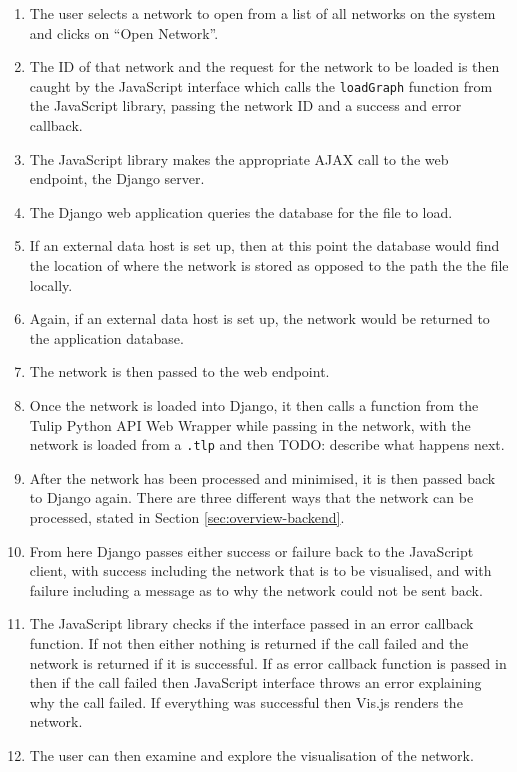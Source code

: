 \documentclass[../dissertation.tex]{subfiles}
\begin{document}
\begin{enumerate}
    \item The user selects a network to open from a list of all networks on the system and clicks on ``Open Network''.
    \item The ID of that network and the request for the network to be loaded is then caught by the JavaScript interface which calls the \texttt{loadGraph} function from the JavaScript library, passing the network ID and a success and error callback.
    \item The JavaScript library makes the appropriate AJAX call to the web endpoint, the Django server.
    \item The Django web application queries the database for the file to load.
    \item If an external data host is set up, then at this point the database would find the location of where the network is stored as opposed to the path the the file locally.
    \item Again, if an external data host is set up, the network would be returned to the application database.
    \item The network is then passed to the web endpoint.
    \item Once the network is loaded into Django, it then calls a function from the Tulip Python API Web Wrapper while passing in the network, with the network is loaded from a \texttt{.tlp} and then TODO: describe what happens next.
    \item After the network has been processed and minimised, it is then passed back to Django again. There are three different ways that the network can be processed, stated in Section \ref{sec:overview-backend}.
    \item From here Django passes either success or failure back to the JavaScript client, with success including the network that is to be visualised, and with failure including a message as to why the network could not be sent back.
    \item The JavaScript library checks if the interface passed in an error callback function. If not then either nothing is returned if the call failed and the network is returned if it is successful. If as error callback function is passed in then if the call failed then JavaScript interface throws an error explaining why the call failed. If everything was successful then Vis.js renders the network.
    \item The user can then examine and explore the visualisation of the network.
\end{enumerate}
\end{document}
